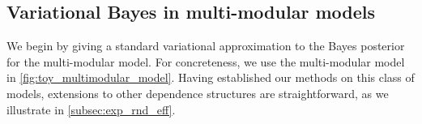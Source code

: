 
%




\subsection{Variational Bayes in multi-modular models}\label{subsec:vi_multi}

We begin by giving a standard variational approximation to the Bayes posterior for the multi-modular model.
For concreteness, we use the multi-modular model in \cref{fig:toy_multimodular_model}.
Having established our methods on this class of models, extensions to other dependence structures are straightforward, as we illustrate in \cref{subsec:exp_rnd_eff}.

